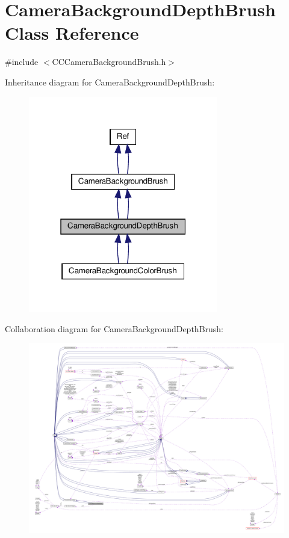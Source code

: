 \hypertarget{classCameraBackgroundDepthBrush}{}\section{Camera\+Background\+Depth\+Brush Class Reference}
\label{classCameraBackgroundDepthBrush}


{\ttfamily \#include $<$C\+C\+Camera\+Background\+Brush.\+h$>$}



Inheritance diagram for Camera\+Background\+Depth\+Brush\+:
\nopagebreak
\begin{figure}[H]
\begin{center}
\leavevmode
\includegraphics[width=235pt]{classCameraBackgroundDepthBrush__inherit__graph}
\end{center}
\end{figure}


Collaboration diagram for Camera\+Background\+Depth\+Brush\+:
\nopagebreak
\begin{figure}[H]
\begin{center}
\leavevmode
\includegraphics[width=350pt]{classCameraBackgroundDepthBrush__coll__graph}
\end{center}
\end{figure}
